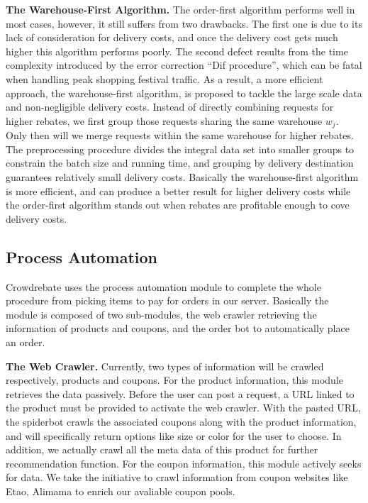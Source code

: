 \textbf{The Warehouse-First Algorithm.} The order-first algorithm performs well in most cases, however, it still suffers from two drawbacks. The first one is due to its lack of consideration for delivery costs, and once the delivery cost gets much higher this algorithm performs poorly. The second defect results from the time complexity introduced by the error correction ``Dif procedure'', which can be fatal when handling peak shopping festival traffic. As a result, a more efficient approach, the warehouse-first algorithm, is proposed to tackle the large scale data and non-negligible delivery costs. Instead of directly combining requests for higher rebates, we first group those requests sharing the same warehouse $w_j$. Only then will we merge requests within the same warehouse for higher rebates. The preprocessing procedure divides the integral data set into smaller groups to constrain the batch size and running time, and grouping by delivery destination guarantees relatively small delivery costs. Basically the warehouse-first algorithm is more efficient, and can produce a better result for higher delivery costs while the order-first algorithm stands out when rebates are profitable enough to cove delivery costs.

\subsection{Process Automation}

Crowdrebate uses the process automation module to complete the whole procedure from picking items to pay for orders in our server. Basically the module is composed of two sub-modules, the web crawler retrieving the information of products and coupons, and the order bot to automatically place an order. 

\textbf{The Web Crawler.} Currently, two types of information will be crawled respectively, products and coupons. For the product information, this module retrieves the data passively. Before the user can post a request, a URL linked to the product must be provided to activate the web crawler. With the pasted URL, the spiderbot crawls the associated coupons along with the product information, and will specifically return options like size or color for the user to choose. In addition, we actually crawl all the meta data of this product for further recommendation function. For the coupon information, this module actively seeks for data. We take the initiative to crawl information from coupon websites like Etao, Alimama to enrich our avaliable coupon pools. 

